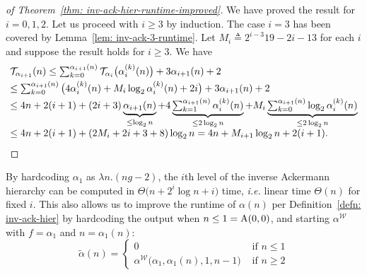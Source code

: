 \begin{proof}[of Theorem~\ref{thm: inv-ack-hier-runtime-improved}]
	We have proved the result for $i = 0, 1, 2$. Let us proceed with $i\ge 3$ by induction. The case $i = 3$ has been covered by Lemma~\ref{lem: inv-ack-3-runtime}. Let $M_i \triangleq 2^{i-3}19 - 2i - 13$ for each $i$ and suppose the result holds for $i\ge 3$. We have
	\begin{equation*}
	\begin{array}{@{}l@{}}
	 \runtime_{\alpha_{i+1}}(n) \le \sum_{k=0}^{\alpha_{i+1}(n)} \runtime_{\alpha_i}\big(\alpha_i^{(k)}(n)\big) + 3\alpha_{i+1}(n) + 2 \\[3pt]
	\le \sum_{k=0}^{\alpha_{i+1}(n)}\big(4\alpha_i^{(k)}(n) + M_i\log_2\alpha_i^{(k)}(n) + 2i \big) + 3\alpha_{i+1}(n) + 2 \\[3pt]
  \le 4n + 2(i+1) + (2i + 3)\underbrace{\alpha_{i+1}(n)}_{\le \log_2n} + 4\underbrace{\textstyle \sum_{k=1}^{\alpha_{i+1}(n)}\alpha_i^{(k)}(n)}_{\le 2\log_2n} + M_i\underbrace{\textstyle \sum_{k=0}^{\alpha_{i+1}(n)}\log_2\alpha_i^{(k)}(n)}_{\le 2\log_2n} \\[3pt]
	\le 4n + 2(i+1) + (2M_i + 2i + 3 + 8)\log_2n
	= 4n + M_{i+1}\log_2n + 2(i+1).
	\end{array}
	\end{equation*}
\end{proof}
By hardcoding $\alpha_1$ as $\lambda n.(ng-2)$, the $i$th level of the inverse Ackermann hierarchy can be computed in $\Theta\big(n + 2^i\log n  + i\big)$ time, \emph{i.e.} linear time $\Theta(n)$ for fixed $i$.
This also allows us to improve the runtime of $\alpha(n)$ per Definition~\ref{defn: inv-ack-hier} by hardcoding the output when $n\le 1 = \text{A}(0, 0)$, and starting $\alpha^{\mathcal{W}}$ with $f = \alpha_1$ and $n = \alpha_1(n)$:
\begin{equation*}
\tilde{\alpha}(n) = \begin{cases}
0 & \text{ if } n \le 1 \\ \alpha^{\mathcal{W}}\big(\alpha_1, \alpha_1(n), 1, n-1\big) & \text{ if } n \ge 2
\end{cases}
\end{equation*}
